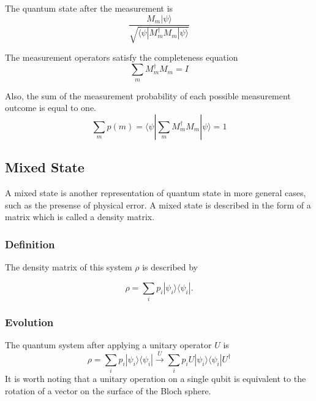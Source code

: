  The quantum state after the measurement is 
 \begin{equation}
  \frac{M_m|\psi\rangle}{\sqrt{\langle \psi|M^{\dagger}_m M_m|\psi\rangle}}
 \end{equation}


The measurement operators satisfy the completeness equation
\begin{equation}
  \sum_{m} M^{\dagger}_m M_m = I
\end{equation}


Also, the sum of the measurement probability of each possible measurement outcome is equal to one.
\begin{equation}
  \sum_{m} p(m) = \langle \psi|\sum_{m} M^{\dagger}_m M_m|\psi\rangle = 1
\end{equation}

 \subsection{Mixed State}

 A mixed state is another representation of quantum state in more general cases, such as the presense of physical error.
A mixed state is described in the form of a matrix which is called a density matrix. 

\subsubsection{Definition}

The density matrix of this system $\rho$ is described by 

\begin{equation}
  \rho = \sum_i p_i |\psi_i\rangle\langle\psi_i|.
\end{equation}

\subsubsection{Evolution}

The quantum system after applying a unitary operator $U$ is
\begin{equation}
  \rho = \sum_i p_i |\psi_i\rangle\langle\psi_i| \xrightarrow{U} \sum_i p_i U|\psi_i\rangle\langle\psi_i|U^{\dagger}
\end{equation}
It is worth noting that a unitary operation on a single qubit is equivalent to the rotation of a vector on the surface of the Bloch sphere.
